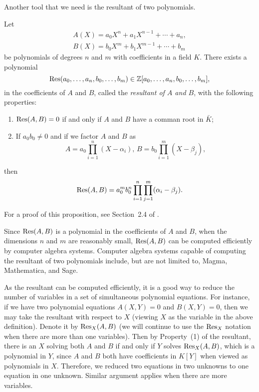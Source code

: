 Another tool that we need is the resultant of two polynomials.

\begin{proposition}
  Let
  \[
  \begin{gathered}
    A(X) = a_0 X^n + a_1 X^{n-1} + \cdots + a_n,\\
    B(X) = b_0 X^m + b_1 X^{m-1} + \cdots + b_m
  \end{gathered}
  \]
  be polynomials of degrees $n$ and $m$ with coefficients
  in a field $K$. There exists a polynomial
  \[
  \mathrm{Res}(a_0, \dots, a_n, b_0, \dots, b_m) \in \mathbb{Z}[a_0, \dots, a_n, b_0,
  \dots, b_m],
  \]
  in the coefficients of $A$ and $B$, called the \emph{resultant of
    $A$ and $B$}, with the following properties:
  \begin{enumerate}
  \item $\mathrm{Res}(A, B) = 0$ if and only if $A$ and $B$ have a comman root
    in $\bar{K}$;

  \item If $a_0 b_0 \ne 0$ and if we factor $A$ and $B$ as
    \[
    A = a_0 \prod_{i=1}^n (X - \alpha_i),\,
    B = b_0 \prod_{i=1}^m (X - \beta_j),
    \]
  \end{enumerate}
  then
  \[
  \mathrm{Res}(A, B) = a_0^m b_0^n \prod_{i=1}^n \prod_{j=1}^m (\alpha_i -
  \beta_j).
  \]
\end{proposition}

For a proof of this proposition, see Section~2.4 of \cite{MR2316407}.

\begin{remark}
  Since $\mathrm{Res}(A, B)$ is a polynomial in the coefficients of $A$ and
  $B$, when the dimensions $n$ and $m$ are reasonably small, $\mathrm{Res}(A,
  B)$ can be computed efficiently by computer algebra
  systems. Computer algebra systems capable of computing the resultant
  of two polynomials include, but are not limited to, Magma,
  Mathematica, and Sage.

  As the resultant can be computed efficiently, it is a good way to
  reduce the number of variables in a set of simultaneous polynomial
  equations. For instance, if we have two polynomial equations $A(X,
  Y) = 0$ and $B(X, Y) = 0$, then we may take the resultant with
  respect to $X$ (viewing $X$ as the variable in the above
  definition). Denote it by $\mathrm{Res}_X(A, B)$ (we will continue to use
  the $\mathrm{Res}_X$ notation when there are more than one variables). Then
  by Property~(1) of the resultant, there is an $X$ solving both $A$
  and $B$ if and only if $Y$ solves $\mathrm{Res}_X(A, B)$, which is a
  polynomial in $Y$, since $A$ and $B$ both have coefficients in
  $K[Y]$ when viewed as polynomials in $X$. Therefore, we reduced two
  equations in two unknowns to one equation in one unknown. Similar
  argument applies when there are more variables.
\end{remark}

